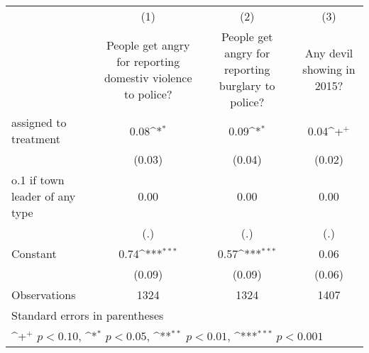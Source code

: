 {
\def\sym#1{\ifmmode^{#1}\else\(^{#1}\)\fi}
\begin{tabular}{l*{3}{c}}
\hline\hline
                    &\multicolumn{1}{c}{(1)}&\multicolumn{1}{c}{(2)}&\multicolumn{1}{c}{(3)}\\
                    &\multicolumn{1}{c}{People get angry for reporting domestiv violence to police?}&\multicolumn{1}{c}{People get angry for reporting burglary to police?}&\multicolumn{1}{c}{Any devil showing in 2015?}\\
\hline
assigned to treatment&        0.08\sym{*}  &        0.09\sym{*}  &        0.04\sym{+}  \\
                    &      (0.03)         &      (0.04)         &      (0.02)         \\
[1em]
o.1 if town leader of any type&        0.00         &        0.00         &        0.00         \\
                    &         (.)         &         (.)         &         (.)         \\
[1em]
Constant            &        0.74\sym{***}&        0.57\sym{***}&        0.06         \\
                    &      (0.09)         &      (0.09)         &      (0.06)         \\
\hline
Observations        &        1324         &        1324         &        1407         \\
\hline\hline
\multicolumn{4}{l}{\footnotesize Standard errors in parentheses}\\
\multicolumn{4}{l}{\footnotesize \sym{+} \(p<0.10\), \sym{*} \(p<0.05\), \sym{**} \(p<0.01\), \sym{***} \(p<0.001\)}\\
\end{tabular}
}
